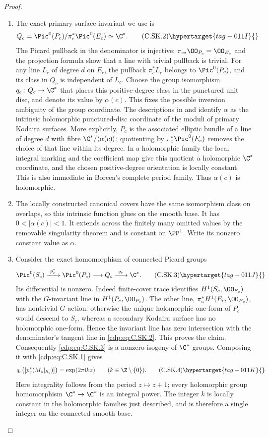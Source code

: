 \begin{proof}
\begin{enumerate}[label={$\langle1\rangle$\arabic*.},leftmargin=*]
\item The exact primary-surface invariant we use is
\[
 Q_c=\Pic^0(P_c)/\pi_c^*\Pic^0(E_c)\simeq\C^*.
\tag{C.SK.2}\hypertarget{tag-011I}{}\label{cdp:eq:C.SK.2}
\]
The Picard pullback in the denominator is injective:
$\pi_{c*}\OO_{P_c}=\OO_{E_c}$ and the projection formula
show that a line with trivial pullback is trivial. For
any line $L_c$ of degree $d$ on $E_c$, the pullback
$\pi_c^*L_c$ belongs to $\Pic^0(P_c)$, and its class in
$Q_c$ is independent of $L_c$. Choose the group
isomorphism $q_c:Q_c\to\C^*$ that places this
positive-degree class in the punctured unit disc, and
denote its value by $\alpha(c)$.
This fixes the possible inversion ambiguity of the
group coordinate. The descriptions in
\cite[Theorem~4 and Remark~1]{Borcea1984} and
\cite[\S1, pp.~2--3]{SS2002} identify $\alpha$ as the
intrinsic holomorphic punctured-disc coordinate of the
moduli of primary Kodaira surfaces. More explicitly,
$P_c$ is the associated elliptic bundle of a line of
degree $d$ with fibre $\C^*/\langle\alpha(c)\rangle$;
quotienting by $\pi_c^*\Pic^0(E_c)$ removes the choice
of that line within its degree. In a holomorphic
family the local integral marking and the coefficient
map give this quotient a holomorphic $\C^*$ coordinate,
and the chosen positive-degree orientation is locally
constant. This is also immediate in Borcea's complete
period family. Thus $\alpha(c)$ is holomorphic.

\item The locally constructed canonical covers have the same
isomorphism class on overlaps, so this intrinsic
function glues on the smooth base. It has
$0<|\alpha(c)|<1$. It extends across the finitely many
omitted values by the removable singularity theorem
and is constant on $\PP^1$. Write its nonzero constant
value as $\alpha$.

\item Consider the exact homomorphism of connected Picard
groups
\[
 \Pic^0(S_c)\xrightarrow{\ p_c^*\ }\Pic^0(P_c)
          \longrightarrow Q_c\xrightarrow{\ q_c\ }\C^*.
\tag{C.SK.3}\hypertarget{tag-011J}{}\label{cdp:eq:C.SK.3}
\]
Its differential is nonzero. Indeed finite-cover trace
identifies $H^1(S_c,\OO_{S_c})$ with the $G$-invariant
line in $H^1(P_c,\OO_{P_c})$. The other line,
$\pi_c^*H^1(E_c,\OO_{E_c})$, has nontrivial $G$ action:
otherwise the unique holomorphic one-form of $P_c$
would descend to $S_c$, whereas a secondary Kodaira
surface has no holomorphic one-form. Hence the invariant
line has zero intersection with the denominator's
tangent line in \eqref{cdp:eq:C.SK.2}. This proves the claim.
Consequently \eqref{cdp:eq:C.SK.3} is a nonzero isogeny of $\C^*$
groups. Composing it with \eqref{cdp:eq:C.SK.1} gives
\[
 q_c\bigl([p_c^*(M_z|_{S_c})]\bigr)
       =\exp(2\pi\mathrm i k z)
       \qquad(k\in\Z\setminus\{0\}).
\tag{C.SK.4}\hypertarget{tag-011K}{}\label{cdp:eq:C.SK.4}
\]
Here integrality follows from the period $z\mapsto z+1$;
every holomorphic group homomorphism $\C^*\to\C^*$ is
an integral power. The integer $k$ is locally constant
in the holomorphic families just described, and is
therefore a single integer on the connected smooth base.


\end{enumerate}
\end{proof}
